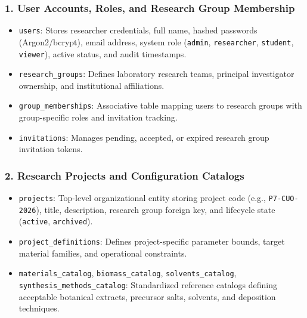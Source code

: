 \documentclass[12pt,a4paper,oneside]{report}
\begin{document}
{{{\subsubsection{1. User Accounts, Roles, and Research Group Membership}
\begin{itemize}
    \item \texttt{users}: Stores researcher credentials, full name, hashed passwords (Argon2/bcrypt), email address, system role (\texttt{admin}, \texttt{researcher}, \texttt{student}, \texttt{viewer}), active status, and audit timestamps.
    \item \texttt{research\_groups}: Defines laboratory research teams, principal investigator ownership, and institutional affiliations.
    \item \texttt{group\_memberships}: Associative table mapping users to research groups with group-specific roles and invitation tracking.
    \item \texttt{invitations}: Manages pending, accepted, or expired research group invitation tokens.
\end{itemize}

\subsubsection{2. Research Projects and Configuration Catalogs}
\begin{itemize}
    \item \texttt{projects}: Top-level organizational entity storing project code (e.g., \texttt{P7-CUO-}\allowbreak\texttt{2026}), title, description, research group foreign key, and lifecycle state (\texttt{active}, \texttt{archived}).
    \item \texttt{project\_definitions}: Defines project-specific parameter bounds, target material families, and operational constraints.
    \item \texttt{materials\_catalog}, \texttt{biomass\_catalog}, \texttt{solvents\_catalog}, \texttt{synthesis\_methods\_catalog}: Standardized reference catalogs defining acceptable botanical extracts, precursor salts, solvents, and deposition techniques.
\end{itemize}

}}}
\end{document}
